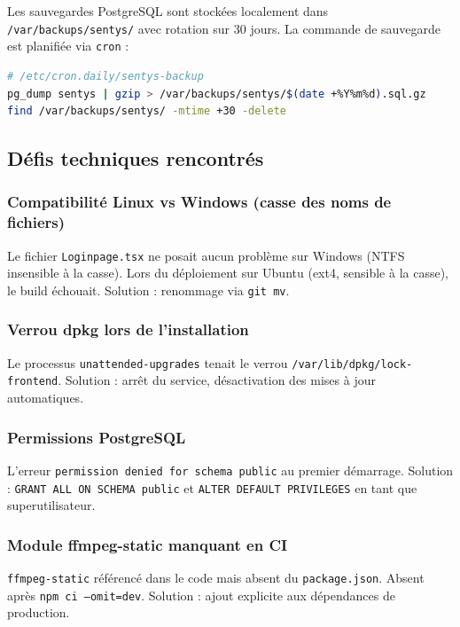 \documentclass[12pt,a4paper]{article}
\begin{document}
Les sauvegardes PostgreSQL sont stockées localement dans \texttt{/var/backups/sentys/} avec rotation sur 30 jours. La commande de sauvegarde est planifiée via \texttt{cron} :

\begin{lstlisting}[language=bash]
# /etc/cron.daily/sentys-backup
pg_dump sentys | gzip > /var/backups/sentys/$(date +%Y%m%d).sql.gz
find /var/backups/sentys/ -mtime +30 -delete
\end{lstlisting}

\subsection{Défis techniques rencontrés}

\subsubsection{Compatibilité Linux vs Windows (casse des noms de fichiers)}
Le fichier \texttt{Loginpage.tsx} ne posait aucun problème sur Windows (NTFS insensible à la casse). Lors du déploiement sur Ubuntu (ext4, sensible à la casse), le build échouait. Solution : renommage via \texttt{git mv}.

\subsubsection{Verrou dpkg lors de l'installation}
Le processus \texttt{unattended-upgrades} tenait le verrou \texttt{/var/lib/dpkg/lock-frontend}. Solution : arrêt du service, désactivation des mises à jour automatiques.

\subsubsection{Permissions PostgreSQL}
L'erreur \texttt{permission denied for schema public} au premier démarrage. Solution : \texttt{GRANT ALL ON SCHEMA public} et \texttt{ALTER DEFAULT PRIVILEGES} en tant que superutilisateur.

\subsubsection{Module ffmpeg-static manquant en CI}
\texttt{ffmpeg-static} référencé dans le code mais absent du \texttt{package.json}. Absent après \texttt{npm ci --omit=dev}. Solution : ajout explicite aux dépendances de production.
\end{document}
